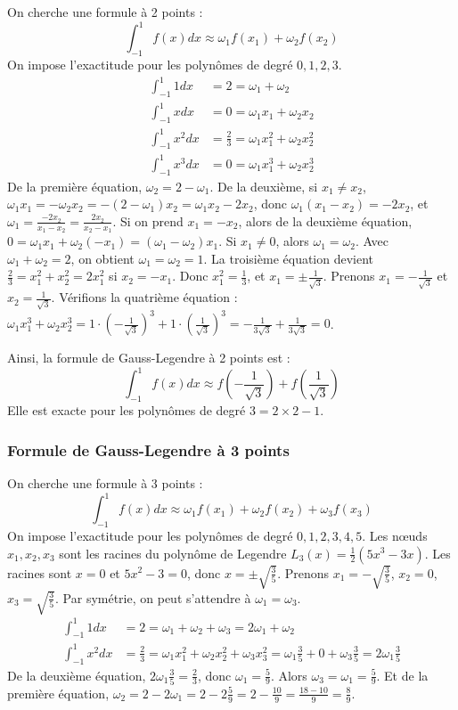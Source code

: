 \documentclass{article}
\begin{document}
On cherche une formule à 2 points :
\[
\int_{-1}^{1} f(x) dx \approx \omega_1 f(x_1) + \omega_2 f(x_2)
\]
On impose l'exactitude pour les polynômes de degré $0, 1, 2, 3$.
\begin{align*}
\int_{-1}^{1} 1 dx &= 2 = \omega_1 + \omega_2 \\
\int_{-1}^{1} x dx &= 0 = \omega_1 x_1 + \omega_2 x_2 \\
\int_{-1}^{1} x^2 dx &= \frac{2}{3} = \omega_1 x_1^2 + \omega_2 x_2^2 \\
\int_{-1}^{1} x^3 dx &= 0 = \omega_1 x_1^3 + \omega_2 x_2^3
\end{align*}
De la première équation, $\omega_2 = 2 - \omega_1$. De la deuxième, si $x_1 \neq x_2$, $\omega_1 x_1 = - \omega_2 x_2 = - (2-\omega_1) x_2 = \omega_1 x_2 - 2x_2$, donc $\omega_1 (x_1 - x_2) = -2x_2$, et $\omega_1 = \frac{-2x_2}{x_1 - x_2} = \frac{2x_2}{x_2 - x_1}$.
Si on prend $x_1 = -x_2$, alors de la deuxième équation, $0 = \omega_1 x_1 + \omega_2 (-x_1) = (\omega_1 - \omega_2) x_1$. Si $x_1 \neq 0$, alors $\omega_1 = \omega_2$.  Avec $\omega_1 + \omega_2 = 2$, on obtient $\omega_1 = \omega_2 = 1$.
La troisième équation devient $\frac{2}{3} = x_1^2 + x_2^2 = 2 x_1^2$ si $x_2 = -x_1$. Donc $x_1^2 = \frac{1}{3}$, et $x_1 = \pm \frac{1}{\sqrt{3}}$. Prenons $x_1 = -\frac{1}{\sqrt{3}}$ et $x_2 = \frac{1}{\sqrt{3}}$. Vérifions la quatrième équation : $\omega_1 x_1^3 + \omega_2 x_2^3 = 1 \cdot (-\frac{1}{\sqrt{3}})^3 + 1 \cdot (\frac{1}{\sqrt{3}})^3 = -\frac{1}{3\sqrt{3}} + \frac{1}{3\sqrt{3}} = 0$.

Ainsi, la formule de Gauss-Legendre à 2 points est :
\[
\int_{-1}^{1} f(x) dx \approx f\left(-\frac{1}{\sqrt{3}}\right) + f\left(\frac{1}{\sqrt{3}}\right)
\]
Elle est exacte pour les polynômes de degré $3 = 2 \times 2 - 1$.

\subsubsection{Formule de Gauss-Legendre à 3 points}

On cherche une formule à 3 points :
\[
\int_{-1}^{1} f(x) dx \approx \omega_1 f(x_1) + \omega_2 f(x_2) + \omega_3 f(x_3)
\]
On impose l'exactitude pour les polynômes de degré $0, 1, 2, 3, 4, 5$.  Les nœuds $x_1, x_2, x_3$ sont les racines du polynôme de Legendre $L_3(x) = \frac{1}{2} (5x^3 - 3x)$. Les racines sont $x=0$ et $5x^2 - 3 = 0$, donc $x = \pm \sqrt{\frac{3}{5}}$.
Prenons $x_1 = -\sqrt{\frac{3}{5}}$, $x_2 = 0$, $x_3 = \sqrt{\frac{3}{5}}$.  Par symétrie, on peut s'attendre à $\omega_1 = \omega_3$.
\begin{align*}
\int_{-1}^{1} 1 dx &= 2 = \omega_1 + \omega_2 + \omega_3 = 2\omega_1 + \omega_2 \\
\int_{-1}^{1} x^2 dx &= \frac{2}{3} = \omega_1 x_1^2 + \omega_2 x_2^2 + \omega_3 x_3^2 = \omega_1 \frac{3}{5} + 0 + \omega_3 \frac{3}{5} = 2\omega_1 \frac{3}{5}
\end{align*}
De la deuxième équation, $2\omega_1 \frac{3}{5} = \frac{2}{3}$, donc $\omega_1 = \frac{5}{9}$. Alors $\omega_3 = \omega_1 = \frac{5}{9}$.  Et de la première équation, $\omega_2 = 2 - 2\omega_1 = 2 - 2 \frac{5}{9} = 2 - \frac{10}{9} = \frac{18-10}{9} = \frac{8}{9}$.
\end{document}
